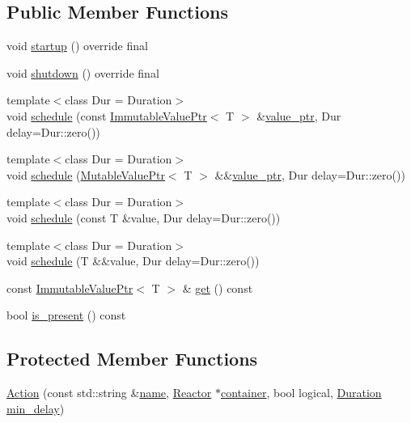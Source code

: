 \subsection*{Public Member Functions}
\begin{DoxyCompactItemize}
\item 
void \hyperlink{classreactor_1_1Action_a60364e6742fb14dd515ff355abc5f3db}{startup} () override final
\item 
void \hyperlink{classreactor_1_1Action_a5e6698cc0893efca3a088f2158345b9c}{shutdown} () override final
\item 
{\footnotesize template$<$class Dur  = Duration$>$ }\\void \hyperlink{classreactor_1_1Action_a795f5b52075c020ec993d1149a720f62}{schedule} (const \hyperlink{classreactor_1_1ImmutableValuePtr}{Immutable\+Value\+Ptr}$<$ T $>$ \&\hyperlink{classreactor_1_1Action_a0002a99457bb578aa89854ad71db4fb2}{value\+\_\+ptr}, Dur delay=Dur\+::zero())
\item 
{\footnotesize template$<$class Dur  = Duration$>$ }\\void \hyperlink{classreactor_1_1Action_a863d3d618afb82404326c5076c9fd32a}{schedule} (\hyperlink{classreactor_1_1MutableValuePtr}{Mutable\+Value\+Ptr}$<$ T $>$ \&\&\hyperlink{classreactor_1_1Action_a0002a99457bb578aa89854ad71db4fb2}{value\+\_\+ptr}, Dur delay=Dur\+::zero())
\item 
{\footnotesize template$<$class Dur  = Duration$>$ }\\void \hyperlink{classreactor_1_1Action_a1dc2c0762950c330da3345f9192d62fa}{schedule} (const T \&value, Dur delay=Dur\+::zero())
\item 
{\footnotesize template$<$class Dur  = Duration$>$ }\\void \hyperlink{classreactor_1_1Action_ad8afb46b0b3bb753538cd37f7eae3be1}{schedule} (T \&\&value, Dur delay=Dur\+::zero())
\item 
const \hyperlink{classreactor_1_1ImmutableValuePtr}{Immutable\+Value\+Ptr}$<$ T $>$ \& \hyperlink{classreactor_1_1Action_a3b7937c4ce3f0a25562a08734ce8c2dc}{get} () const
\item 
bool \hyperlink{classreactor_1_1Action_a91d6979d528882d4aba1c892c130dbd1}{is\+\_\+present} () const
\end{DoxyCompactItemize}
\subsection*{Protected Member Functions}
\begin{DoxyCompactItemize}
\item 
\hyperlink{classreactor_1_1Action_ad0d36ea549eb0b04bd95d69fa8ac5d39}{Action} (const std\+::string \&\hyperlink{classreactor_1_1ReactorElement_a99579f61dbaf5d5d98aebfe26eb8bf77}{name}, \hyperlink{classreactor_1_1Reactor}{Reactor} $\ast$\hyperlink{classreactor_1_1ReactorElement_a25bf298de879a82eefc1ba426be05812}{container}, bool logical, \hyperlink{namespacereactor_aa8375b807a80703545664096c5b5b779}{Duration} \hyperlink{classreactor_1_1BaseAction_a98201db474f34cb9e38151a6960128f0}{min\+\_\+delay})
\end{DoxyCompactItemize}

